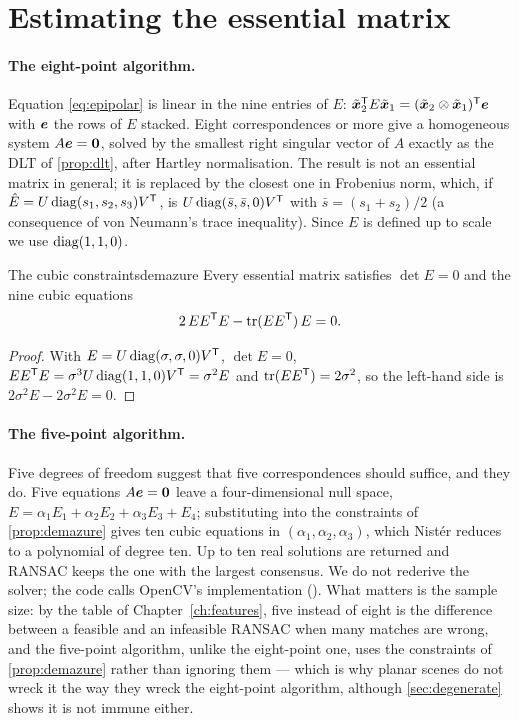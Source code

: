 \section{Estimating the essential matrix}

\paragraph{The eight-point algorithm.} Equation \eqref{eq:epipolar} is
linear in the nine entries of $E$: $\tilde{\bm{x}}_2^{\mathsf{T}} E\tilde{
\bm{x}}_1=(\tilde{\bm{x}}_2\otimes\tilde{\bm{x}}_1)^{\mathsf{T}}\bm{e}$
with $\bm{e}$ the rows of $E$ stacked. Eight correspondences or more
give a homogeneous system $A\bm{e}=\bm{0}$, solved by the smallest
right singular vector of $A$ exactly as the DLT of \cref{prop:dlt},
after Hartley normalisation. The result is not an essential matrix in
general; it is replaced by the closest one in Frobenius norm, which, if
$\hat E=U\operatorname{diag}(s_1,s_2,s_3)V^{\mathsf{T}}$, is $U\operatorname{diag}(\bar s,\bar s,0)V^{\mathsf{T}}$ with
$\bar s=(s_1+s_2)/2$ (a consequence of von Neumann's trace inequality).
Since $E$ is defined up to scale we use $\operatorname{diag}(1,1,0)$.

\begin{proposition}{The cubic constraints}{demazure}
Every essential matrix satisfies $\det E=0$ and the nine cubic equations
\[
2\,EE^{\mathsf{T}} E-\operatorname{tr}(EE^{\mathsf{T}})\,E=0 .
\]
\end{proposition}

\begin{proof}
With $E=U\operatorname{diag}(\sigma,\sigma,0)V^{\mathsf{T}}$, $\det E=0$, $EE^{\mathsf{T}} E=\sigma^3U\operatorname{diag}(
1,1,0)V^{\mathsf{T}}=\sigma^2E$ and $\operatorname{tr}(EE^{\mathsf{T}})=2\sigma^2$, so the left-hand side is
$2\sigma^2E-2\sigma^2E=0$.
\end{proof}

\paragraph{The five-point algorithm.} Five degrees of freedom suggest
that five correspondences should suffice, and they do. Five equations
$A\bm{e}=\bm{0}$ leave a four-dimensional null space,
$E=\alpha_1E_1+\alpha_2E_2+\alpha_3E_3+E_4$; substituting into the
constraints of \cref{prop:demazure} gives ten cubic equations in
$(\alpha_1,\alpha_2,\alpha_3)$, which Nist\'er reduces to a polynomial
of degree ten. Up to ten real solutions are returned and RANSAC keeps
the one with the largest consensus. We do not rederive the solver; the
code calls OpenCV's implementation (). What
matters is the sample size: by the table of Chapter~\ref{ch:features},
five instead of eight is the difference between a feasible and an
infeasible RANSAC when many matches are wrong, and the five-point
algorithm, unlike the eight-point one, uses the constraints of
\cref{prop:demazure} rather than ignoring them --- which is why planar
scenes do not wreck it the way they wreck the eight-point algorithm,
although \cref{sec:degenerate} shows it is not immune either.


